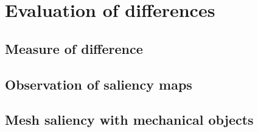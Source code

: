 	\section{Evaluation of differences}
	\label{sec:evaluation_of_differences}

		\subsection{Measure of difference}
		\label{sec:measure_of_difference}

		\subsection{Observation of saliency maps}
		\label{sec:observation_of_saliency_maps}

		\subsection{Mesh saliency with mechanical objects}
		\label{sec:mesh_saliency_with_mechanical_objects}

